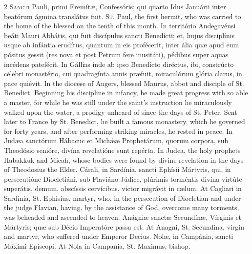 \begin{paracol}{2}
\lettrine[lines=2]{S}{ancti} Pauli, primi Eremítæ, Confessóris; qui 
 quarto Idus Januárii inter beatórum ágmina translátus fuit.
\switchcolumn
{}
\lettrine[lines=2]{S}{t.} Paul, the first hermit, who was carried to the home of the blessed on 
 the tenth of this month.
\switchcolumn*
{}
In território Andegavénsi beáti Mauri Abbátis, qui fuit discípulus sancti 
 Benedícti; et, hujus disciplínis usque ab infántia erudítus, quantum in eis 
 profécerit, inter ália quæ apud eum pósitus 
 gessit (res nova et post Petrum fere inusitáti), pédibus super aquas 
 incédens patefécit. In Gállias inde ab ipso Benedícto diréctus, ibi, 
 constrúcto célebri monastério, cui quadragínta annis præfuit, miraculórum 
 glória clarus, in pace quiévit.
\switchcolumn
{}
In the diocese of Angers, blessed Maurus, abbot and disciple of St. Benedict. 
 Beginning his discipline in infancy, he made great progress with so able a 
 master, for while he was still under the saint's instruction he miraculously 
 walked upon the water, a prodigy unheard of since the days of St. Peter. 
 Sent later to France by St. Benedict, he built a famous monastery, which he 
 governed for forty years, and after performing striking miracles, he rested 
 in peace.
\switchcolumn*
{}
In Judæa sanctórum Hábacuc et Michǽæ 
 Prophetárum, quorum corpora, sub Theodósio senióre, divína revelatióne sunt 
 repérta.
\switchcolumn
{}
In Judea, the holy prophets Habakkuk and Micah, whose bodies were found by 
 divine revelation in the days of Theodosius the Elder.
\switchcolumn*
{}
Cárali, in Sardínia, sancti Ephísii Mártyris, 
 qui, in persecutióne Diocletiáni, sub Flaviáno Júdice, plúrimis torméntis 
 divína virtúte superátis, demum, abscíssis cervícibus, victor migrávit in 
 cælum.
\switchcolumn
{}
At Cagliari in Sardinia, St. Ephisius, martyr, who, in the persecution of 
 Diocletian and under the judge Flavian, having, by the assistance of God, 
 overcome many torments, was beheaded and ascended to heaven.
\switchcolumn*
{}
Anágniæ 
 sanctæ Secundínæ, Vírginis et Mártyris; quæ sub Décio Imperatóre passa est.
\switchcolumn
{}
At Anagni, St. Secundina, virgin and martyr, who suffered under Emperor 
 Decius.
\switchcolumn*
{}
Nolæ, in Campánia, sancti Máximi Epíscopi.
\switchcolumn
{}
At Nola in Campania, St. Maximus, bishop.

\end{paracol}
